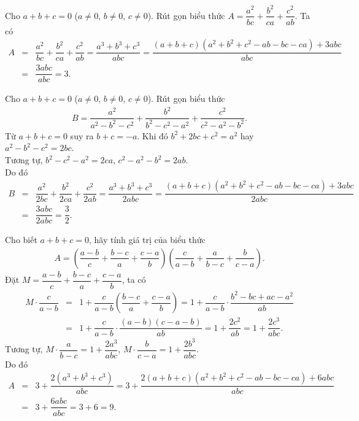 \begin{bt}%
 Cho $a+b+c=0$ ($a\neq 0$, $b\neq 0$, $c\neq 0$). Rút gọn biểu thức $A=\dfrac{a^2}{bc} + \dfrac{b^2}{ca} + \dfrac{c^2}{ab}$.
 \loigiai
  {
  Ta có
  \allowdisplaybreaks
  \begin{eqnarray*}
   A &=& \dfrac{a^2}{bc} + \dfrac{b^2}{ca} + \dfrac{c^2}{ab} = \dfrac{a^3+b^3+c^3}{abc} = \dfrac{(a+b+c)(a^2+b^2+c^2-ab-bc-ca)+3abc}{abc}\\
   &=& \dfrac{3abc}{abc}=3.
  \end{eqnarray*}
  }
\end{bt}

\begin{bt}%
 Cho $a+b+c=0$ ($a\neq 0$, $b\neq 0$, $c\neq 0$). Rút gọn biểu thức
 \begin{eqnarray*}
  B = \dfrac{a^2}{a^2-b^2-c^2} + \dfrac{b^2}{b^2-c^2-a^2} + \dfrac{c^2}{c^2-a^2-b^2}.
 \end{eqnarray*}
 \loigiai
  {
  Từ $a+b+c=0$ suy ra $b+c=-a$. Khi đó $b^2+2bc+c^2=a^2$ hay $a^2-b^2-c^2=2bc$.\\
  Tương tự, $b^2-c^2-a^2=2ca$, $c^2-a^2-b^2=2ab$.\\
  Do đó
  \allowdisplaybreaks
  \begin{eqnarray*}
   B &=& \dfrac{a^2}{2bc} + \dfrac{b^2}{2ca} + \dfrac{c^2}{2ab} = \dfrac{a^3+b^3+c^3}{2abc} = \dfrac{(a+b+c)(a^2+b^2+c^2-ab-bc-ca)+3abc}{2abc}\\
   &=& \dfrac{3abc}{2abc}= \dfrac{3}{2}.
  \end{eqnarray*}
  }
\end{bt}

\begin{bt}%
 Cho biết $a+b+c=0$, hãy tính giá trị của biểu thức
 \begin{eqnarray*}
  A= \left(\dfrac{a-b}{c}+\dfrac{b-c}{a}+\dfrac{c-a}{b}\right) \left(\dfrac{c}{a-b}+\dfrac{a}{b-c}+\dfrac{b}{c-a}\right).
 \end{eqnarray*}
 \loigiai
  {
  Đặt $M = \dfrac{a-b}{c} + \dfrac{b-c}{a} + \dfrac{c-a}{b}$, ta có
  \begin{eqnarray*}
   M \cdot \dfrac{c}{a-b} &=& 1 + \dfrac{c}{a-b}\left(\dfrac{b-c}{a}+\dfrac{c-a}{b}\right) = 1 + \dfrac{c}{a-b} \cdot \dfrac{b^2-bc+ac-a^2}{ab} \\
   &=& 1 + \dfrac{c}{a-b} \cdot \dfrac{(a-b)(c-a-b)}{ab} = 1+\dfrac{2c^2}{ab} = 1+\dfrac{2c^3}{abc}.
  \end{eqnarray*}
  Tương tự, $M \cdot \dfrac{a}{b-c} = 1+\dfrac{2a^3}{abc}$, $M \cdot \dfrac{b}{c-a}=1+\dfrac{2b^3}{abc}$.\\
  Do đó
  \allowdisplaybreaks
  \begin{eqnarray*}
   A &=& 3 + \dfrac{2(a^3+b^3+c^3)}{abc} = 3 + \dfrac{2(a+b+c)(a^2+b^2+c^2-ab-bc-ca)+6abc}{abc}\\
   &=& 3 + \dfrac{6abc}{abc} = 3+6=9.
  \end{eqnarray*}
  }
\end{bt}

